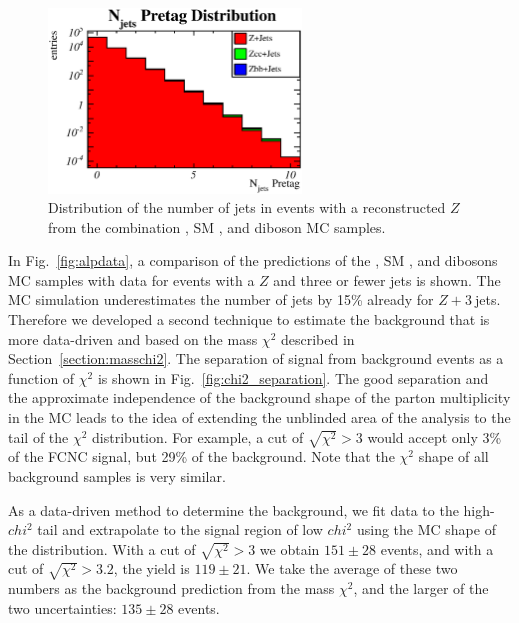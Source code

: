\begin{figure}[t]
  \begin{center}
    \includegraphics[width=0.6\textwidth]{pics/njet_alpgenonly.eps}
  \end{center}
  \caption{Distribution of the number of jets in events with a
    reconstructed $Z$ from the combination \alp \Zj, SM \ttbar, and
    diboson MC samples.}
  \label{fig:zjets}
\end{figure}

In Fig.~\ref{fig:alpdata}, a comparison of the predictions of the
\alp, SM \ttbar, and dibosons MC samples with data for events with a
$Z$ and three or fewer jets is shown.  The MC simulation
underestimates the number of jets by 15\% already for
$Z+3\:$jets. Therefore we developed a second technique to estimate the
\Zj background that is more data-driven and based on the mass $\chi^2$
described in Section~\ref{section:masschi2}. The separation of signal
from background events as a function of $\chi^2$ is shown in
Fig.~\ref{fig:chi2_separation}. The good separation and the
approximate independence of the background shape of the parton
multiplicity in the \Zj MC leads to the idea of extending the
unblinded area of the analysis to the tail of the $\chi^2$
distribution. For example, a cut of $\sqrt{\chi^2}>3$ would accept
only 3\% of the FCNC signal, but 29\% of the \Zj background. Note that
the $\chi^2$ shape of all background samples is very similar.

As a data-driven method to determine the \Zj background, we fit data
to the high-$chi^2$ tail and extrapolate to the signal region of low
$chi^2$ using the MC shape of the \Zj distribution.  With a cut of
$\sqrt{\chi^2}>3$ we obtain $151 \pm 28$ events, and with a cut of
$\sqrt{\chi^2}>3.2$, the yield is $119 \pm 21$. We take the average of
these two numbers as the background prediction from the mass $\chi^2$,
and the larger of the two uncertainties: $135 \pm 28$ events.


